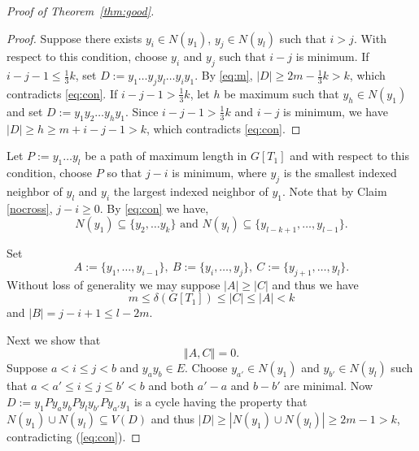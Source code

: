 \documentclass[oneside,12pt]{memoir}
\begin{document}
\begin{proof}[Proof of Theorem~\ref{thm:good}]
\begin{proof}
Suppose there exists $y_i\in N(y_1)$, $y_j\in N(y_l)$ such that $i>j$.  With respect to this condition, choose $y_i$ and $y_j$ such that $i-j$ is minimum.  If $i-j-1\leq \frac{1}{3}k$, 
set $D:=y_1\dots y_jy_l\dots y_iy_1$.  By \eqref{eq:m}, %
$|D|\geq 2m-\frac{1}{3}k>k$, which contradicts \eqref{eq:con}.  If $i-j-1>\frac{1}{3}k$, let $h$ be maximum such that $y_h\in N(y_1)$ and set $D:= y_1y_2\dots y_hy_1$.  Since $i-j-1>\frac{1}{3}k$ and $i-j$ is minimum, we have $|D|\geq h\geq m+i-j-1>k$, which contradicts \eqref{eq:con}.
\end{proof}

Let $P:=y_1\dots y_l$ be a path of maximum length in $G[T_1]$ and with respect to this condition, choose $P$ so that  $j-i$ is minimum, where $y_j$ is the smallest indexed neighbor of $y_l$ and $y_i$ the largest indexed neighbor  of $y_1$.  %
Note that by Claim \ref{nocross}, $j-i\geq 0$. By \eqref{eq:con} we have,
\begin{equation}
 N(y_{1})\subseteq \{y_2,\dots y_k\} \textrm{ and } N(y_{l})\subseteq \{y_{l-k+1},\dots,y_{l-1}\}. \label{dis}\end{equation}

Set \[A:=\{y_{1},\dots,y_{i-1}\},\ B:=\{y_{i},\dots,y_{j}\},\ C:=\{y_{j+1},\dots,y_{l}\}.\]
Without loss of generality we may suppose $|A|\geq |C|$ and thus we have \begin{equation}\label{ACbounds}m\leq\delta(G[T_{1}])\leq|C|\leq |A|< k\end{equation} and $|B|= j-i+1\leq l-2m$.

Next we show that \begin{equation}
\left\Vert A,C\right\Vert =0.\label{dj}\end{equation}
 Suppose $a<i\leq j<b$ and $y_{a}y_{b}\in E$. Choose $y_{a'}\in N(y_{1})$
and $y_{b'}\in N(y_{l})$ such that $a<a'\le i\leq j\le b'<b$ and
both $a'-a$ and $b-b'$ are minimal.  Now $D:=y_{1}Py_{a}y_{b}Py_{l}y_{b'}Py_{a'}y_{1}$ is a cycle having the property that $N(y_1)\cup N(y_l)\subseteq V(D)$ and thus $|D|\geq|N(y_1)\cup N(y_l)|\geq 2m-1>k$, contradicting (\ref{eq:con}).


\end{proof}
\end{document}
